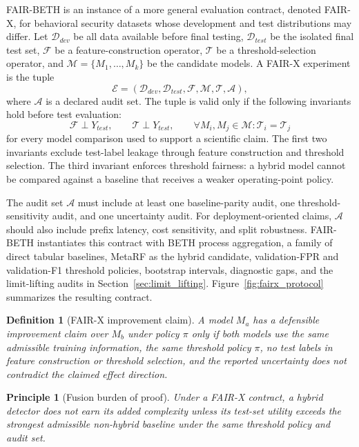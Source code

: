 \documentclass[journal]{IEEEtran}
\newtheorem{definition}{Definition}
\newtheorem{principle}{Principle}
\begin{document}
FAIR-BETH is an instance of a more general evaluation contract, denoted FAIR-X, for behavioral security datasets whose development and test distributions may differ. Let $\mathcal{D}_{dev}$ be all data available before final testing, $\mathcal{D}_{test}$ be the isolated final test set, $\mathcal{F}$ be a feature-construction operator, $\mathcal{T}$ be a threshold-selection operator, and $\mathcal{M}=\{M_1,\ldots,M_k\}$ be the candidate models. A FAIR-X experiment is the tuple
\[
\mathcal{E}=(\mathcal{D}_{dev},\mathcal{D}_{test},\mathcal{F},\mathcal{M},\mathcal{T},\mathcal{A}),
\]
where $\mathcal{A}$ is a declared audit set. The tuple is valid only if the following invariants hold before test evaluation:
\[
\mathcal{F}\perp Y_{test}, \qquad \mathcal{T}\perp Y_{test}, \qquad
\forall M_i,M_j\in\mathcal{M}: \mathcal{T}_i=\mathcal{T}_j
\]
for every model comparison used to support a scientific claim. The first two invariants exclude test-label leakage through feature construction and threshold selection. The third invariant enforces threshold fairness: a hybrid model cannot be compared against a baseline that receives a weaker operating-point policy.

The audit set $\mathcal{A}$ must include at least one baseline-parity audit, one threshold-sensitivity audit, and one uncertainty audit. For deployment-oriented claims, $\mathcal{A}$ should also include prefix latency, cost sensitivity, and split robustness. FAIR-BETH instantiates this contract with BETH process aggregation, a family of direct tabular baselines, MetaRF as the hybrid candidate, validation-FPR and validation-F1 threshold policies, bootstrap intervals, diagnostic gaps, and the limit-lifting audits in Section~\ref{sec:limit_lifting}. Figure~\ref{fig:fairx_protocol} summarizes the resulting contract.

\begin{definition}[FAIR-X improvement claim]
A model $M_a$ has a defensible improvement claim over $M_b$ under policy $\pi$ only if both models use the same admissible training information, the same threshold policy $\pi$, no test labels in feature construction or threshold selection, and the reported uncertainty does not contradict the claimed effect direction.
\end{definition}

\begin{principle}[Fusion burden of proof]
Under a FAIR-X contract, a hybrid detector does not earn its added complexity unless its test-set utility exceeds the strongest admissible non-hybrid baseline under the same threshold policy and audit set.
\end{principle}
\end{document}
